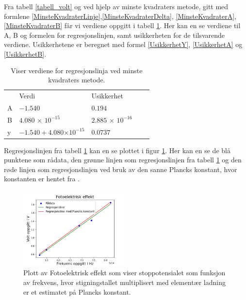 \documentclass[twocolumn, 11pt]{article} %
\begin{document}
Fra tabell \ref{tabell_volt} og ved hjelp av minste kvadraters metode, gitt med formlene \eqref{MinsteKvadraterLinje},\eqref{MinsteKvadraterDelta}, \eqref{MinsteKvadraterA}, \eqref{MinsteKvadraterB} får vi verdiene oppgitt i tabell \ref{minste_resultat}. Her kan en se verdiene til A, B og formelen for regresjonslinjen, samt usikkerheten for de tilsvarende verdiene. Usikkerhetene er beregnet med formel \eqref{UsikkerhetY}, \eqref{UsikkerhetA} og \eqref{UsikkerhetB}.


\begin{table}[h]
\caption{Viser verdiene for regresjonslinja ved minste kvadraters metode.}
\begin{tabular}{|l|l|l|ll}
\cline{1-3}
  & Verdi                                       & Usikkerhet &  &  \\ \cline{1-3}
A & $-1.540$                                      & $0.194$  &  &  \\ \cline{1-3}
B & $4.080$ × $10^{-15}$                              & $2.885$ × $10^{-16}$  &  &  \\ \cline{1-3}
y & $-1.540+4.080$×$10^{-15}$                      & $0.0737$ &  &  \\ \cline{1-3}
\end{tabular}
\label{minste_resultat}
\end{table}

Regresjonslinjen fra tabell \ref{minste_resultat} kan en se plottet i figur \ref{plot_plack}. Her kan en se de blå punktene som rådata, den grønne linjen som regresjonslinjen fra tabell \ref{minste_resultat} og den røde linjen som regresjonslinjen ved bruk av den sanne Plancks konstant, hvor konstanten er hentet fra \cite{Planckskonstant}.

\begin{figure}[H]
\includegraphics[width=0.49\textwidth]{Images/lab4.png}
\caption{Plott av Fotoelektrisk effekt som viser  stoppotensialet som funksjon av frekvens, hvor stigningstallet multiplisert med elementær ladning er et estimatet på Plancks konstant.}
\label{plot_plack}
\end{figure}
\end{document}
